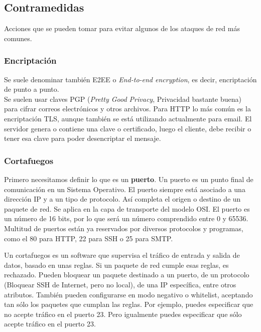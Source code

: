 \documentclass[a4paper, 11pt]{report} %
\begin{document}
\subsection{Contramedidas}
Acciones que se pueden tomar para evitar algunos de los ataques de red más comunes.
\subsubsection{Encriptación}
Se suele denominar también E2EE o \textit{End-to-end encryption}, es decir, encriptación de punto a punto.\\
Se suelen usar claves PGP (\textit{Pretty Good Privacy}, Privacidad bastante buena) para cifrar correos electrónicos y otros archivos. Para HTTP lo más común es la encriptación TLS, aunque también se está utilizando actualmente para email. El servidor genera o contiene una clave o certificado, luego el cliente, debe recibir o tener esa clave para poder desencriptar el mensaje.
\subsubsection{Cortafuegos}
Primero necesitamos definir lo que es un \textbf{puerto}. Un puerto es un punto final de comunicación en un Sistema Operativo. El puerto siempre está asociado a una dirección IP y a un tipo de protocolo. Así completa el origen o destino de un paquete de red. Se aplica en la capa de transporte del modelo OSI. El puerto es un número de 16 bits, por lo que será un número comprendido entre 0 y 65536. Multitud de puertos están ya reservados por diversos protocolos y programas, como el 80 para HTTP, 22 para SSH o 25 para SMTP.

Un cortafuegos es un software que supervisa el tráfico de entrada y salida de datos, basado en unas reglas. Si un paquete de red cumple esas reglas, es rechazado. Pueden bloquear un paquete destinado a un puerto, de un protocolo (Bloquear SSH de Internet, pero no local), de una IP específica, entre otros atributos. También pueden configurarse en modo negativo o whitelist, aceptando tan sólo los paquetes que cumplan las reglas. Por ejemplo, puedes especificar que no acepte tráfico en el puerto 23. Pero igualmente puedes especificar que sólo acepte tráfico en el puerto 23.
\end{document}
